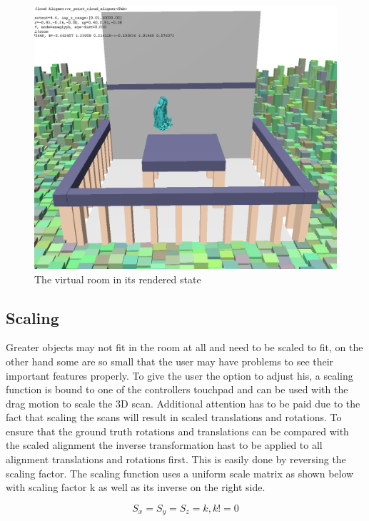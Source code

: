 \documentclass[hyperref,english,bachelorofscience,bibnum,twoside]{cgvpub}
\begin{document}
\begin{figure}[htbp]
	\centering
		\includegraphics[width= \linewidth]{vrroom.png}
	\caption{The virtual room in its rendered state}
	\label{fig:room}
\end{figure}


 
\subsection{Scaling}

Greater objects may not fit in the room at all and need to be scaled to fit, on the other hand some are so small that the user may have problems to see their important features properly. To give the user the option to adjust his, a scaling function is bound to one of the controllers touchpad and can be used with the drag motion to scale the 3D scan. Additional attention has to be paid due to the fact that scaling the scans will result in scaled translations and rotations. To ensure that the ground truth rotations and translations can be compared with the scaled alignment the inverse transformation hast to be applied to all alignment translations and rotations first. This is easily done by reversing the scaling factor. The scaling function uses a uniform scale matrix as shown below with scaling factor k as well as its inverse on the right side.


\[
S_x = S_y = S_z = k,  k != 0
\]
\end{document}
